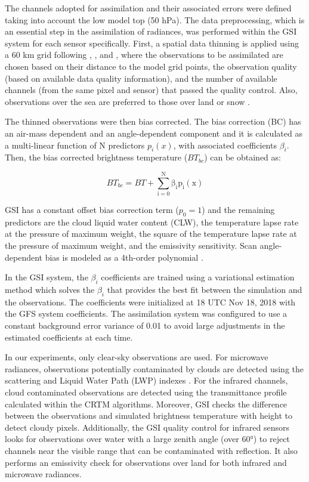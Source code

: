 \documentclass[final,5p,times,twocolumn,authoryear]{elsarticle} %
\begin{document}
The channels adopted for assimilation and their associated errors were defined taking into account the low model top (50 hPa). The data preprocessing, which is an essential step in the assimilation of radiances, was performed within the GSI system for each sensor specifically. First, a spatial data thinning is applied using a 60 km grid following \citet{singh2016}, \citet{jones2013}, and \citet{lin2017a}, where the observations to be assimilated are chosen based on their distance to the model grid points, the observation quality (based on available data quality information), and the number of available channels (from the same pixel and sensor) that passed the quality control. Also, observations over the sea are preferred to those over land or snow \citep{hu2018}.

The thinned observations were then bias corrected. The bias correction (BC) has an air-mass dependent and an angle-dependent component \citep{zhu2014} and it is calculated as a multi-linear function of N predictors \(p_i(x)\), with associated coefficients \(\beta_i\). Then, the bias corrected brightness temperature (\(BT_{bc}\)) can be obtained as:

\begin{equation}
  \mathrm{\mathit{BT_{bc}} =\mathit{ BT} + \sum_{i = 0}^{N} \beta_i p_i (x)}
  \label{eq:eq1}
\end{equation}

GSI has a constant offset bias correction term (\(p_0 = 1\)) and the remaining predictors are the cloud liquid water content (CLW), the temperature lapse rate at the pressure of maximum weight, the square of the temperature lapse rate at the pressure of maximum weight, and the emissivity sensitivity. Scan angle-dependent bias is modeled as a 4th-order polynomial \citep{zhu2014}.

In the GSI system, the \(\beta_i\) coefficients are trained using a variational estimation method which solves the \(\beta_i\) that provides the best fit between the simulation and the observations. The coefficients were initialized at 18 UTC Nov 18, 2018 with the GFS system coefficients. The assimilation system was configured to use a constant background error variance of 0.01 to avoid large adjustments in the estimated coefficients at each time.

In our experiments, only clear-sky observations are used. For microwave radiances, observations potentially contaminated by clouds are detected using the scattering and Liquid Water Path (LWP) indexes \citep{weston2019, zhu2016}. For the infrared channels, cloud contaminated observations are detected using the transmittance profile calculated within the CRTM algorithms. Moreover, GSI checks the difference between the observations and simulated brightness temperature with height to detect cloudy pixels. Additionally, the GSI quality control for infrared sensors looks for observations over water with a large zenith angle (over 60°) to reject channels near the visible range that can be contaminated with reflection. It also performs an emissivity check for observations over land for both infrared and microwave radiances.
\end{document}
